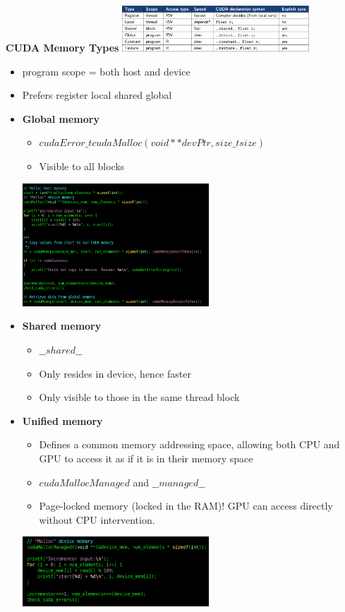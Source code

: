 \documentclass[10pt, landscape]{article}
\begin{document}
\begin{multicols}{4}
\textbf{CUDA Memory Types}
\includegraphics*[width=7cm]{cuda_mem_types.png}
\begin{itemize}
    \item program scope = both host and device
    \item Prefers register \> local \> shared \> global
    \item \textbf{Global memory}
    \begin{itemize}
        \item $cudaError\_t cudaMalloc ( void ** devPtr , size\_t size )$
        \item Visible to all blocks
    \end{itemize}
    \includegraphics*[width=7cm]{unified1.png}
    \item \textbf{Shared memory}
    \begin{itemize}
        \item $ \_\_shared\_\_ $
        \item Only resides in device, hence faster 
        \item Only visible to those in the same thread block
    \end{itemize}
    \item \textbf{Unified memory}
    \begin{itemize}
        \item Defines a common memory addressing space, allowing both CPU and GPU to access it as if it is in their memory space 
        \item $cudaMallocManaged$ and $\_\_managed\_\_$
        \item Page-locked memory (locked in the RAM)! GPU can access directly without CPU intervention.
    \end{itemize}
    \includegraphics*[width=7cm]{unified2.png}
\end{itemize}


\end{multicols}
\end{document}
